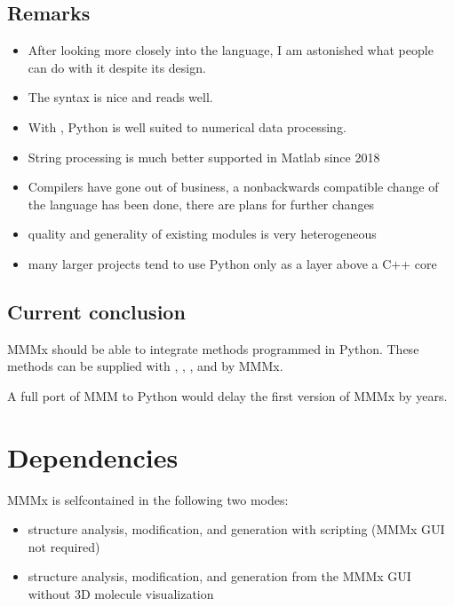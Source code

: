 \documentclass[letterpaper,10pt,english]{sphinxmanual}
\begin{document}
\section{Remarks}
\label{\detokenize{python:remarks}}\begin{itemize}
\item {} 
After looking more closely into the language, I am astonished what people can do with it despite its design.

\item {} 
The syntax is nice and reads well.

\item {} 
With , Python is well suited to numerical data processing.

\item {} 
String processing is much better supported in Matlab since 2018

\item {} 
Compilers have gone out of business, a non\sphinxhyphen{}backwards compatible change of the language has been done, there are plans for further changes

\item {} 
quality and generality of existing modules is very heterogeneous

\item {} 
many larger projects tend to use Python only as a layer above a C++ core

\end{itemize}


\section{Current conclusion}
\label{\detokenize{python:current-conclusion}}
MMMx should be able to integrate methods programmed in Python. These methods can be supplied with , , , and  by MMMx.

A full port of MMM to Python would delay the first version of MMMx by years.


\chapter{Dependencies}
\label{\detokenize{dependencies:dependencies}}\label{\detokenize{dependencies::doc}}
MMMx is self\sphinxhyphen{}contained in the following two modes:
\begin{itemize}
\item {} 
structure analysis, modification, and generation with scripting (MMMx GUI not required)

\item {} 
structure analysis, modification, and generation from the MMMx GUI without 3D molecule visualization

\end{itemize}
\end{document}
